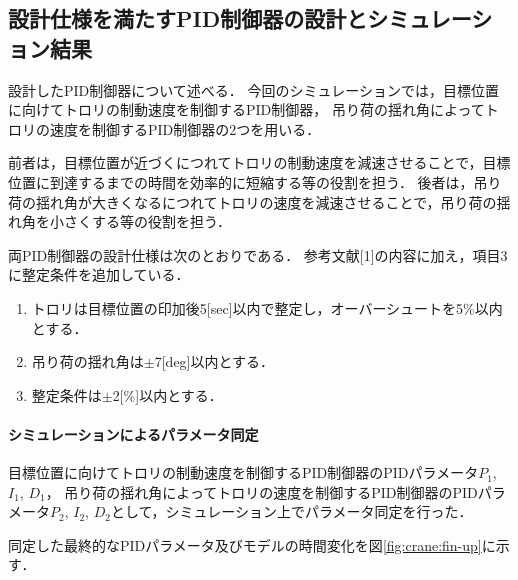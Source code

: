 \documentclass[dvipdfmx,titlepage,a4j]{jsarticle}  %
\begin{document}
\subsection{設計仕様を満たすPID制御器の設計とシミュレーション結果}
設計したPID制御器について述べる．
今回のシミュレーションでは，目標位置に向けてトロリの制動速度を制御するPID制御器，
吊り荷の揺れ角によってトロリの速度を制御するPID制御器の2つを用いる．

前者は，目標位置が近づくにつれてトロリの制動速度を減速させることで，目標位置に到達するまでの時間を効率的に短縮する等の役割を担う．
後者は，吊り荷の揺れ角が大きくなるにつれてトロリの速度を減速させることで，吊り荷の揺れ角を小さくする等の役割を担う．

両PID制御器の設計仕様は次のとおりである．
参考文献[1]の内容に加え，項目3に整定条件を追加している．

\begin{enumerate}
  \item トロリは目標位置の印加後5[sec]以内で整定し，オーバーシュートを5\%以内とする．
  \item 吊り荷の揺れ角は$\pm$7[deg]以内とする．
  \item 整定条件は$\pm$2[\%]以内とする．
\end{enumerate}

\paragraph{シミュレーションによるパラメータ同定}

目標位置に向けてトロリの制動速度を制御するPID制御器のPIDパラメータ$P_1$, $I_1$, $D_1$，
吊り荷の揺れ角によってトロリの速度を制御するPID制御器のPIDパラメータ$P_2$, $I_2$, $D_2$として，シミュレーション上でパラメータ同定を行った．

同定した最終的なPIDパラメータ及びモデルの時間変化を図\ref{fig:crane:fin-up}に示す．
\end{document}
